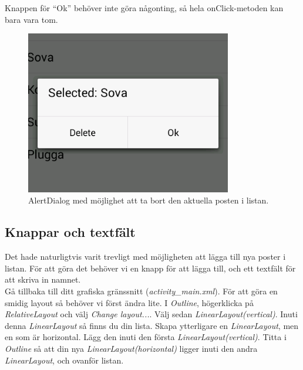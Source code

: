 \documentclass[11 pt, titlepage]{article} %
\begin{document}
Knappen för “Ok” behöver inte göra någonting, så hela onClick-metoden kan bara vara tom.\\

\begin{figure}[ht!]

\centering

\includegraphics[width=90mm]{images/popup.png}

\caption{AlertDialog med möjlighet att ta bort den aktuella posten i listan.}

\label{overflow}

\end{figure} 


\subsection{Knappar och textfält}
Det hade naturligtvis varit trevligt med möjligheten att lägga till nya poster i listan. För att göra det behöver vi en knapp för att lägga till, och ett textfält för att skriva in namnet.\\

Gå tillbaka till ditt grafiska gränssnitt (\textit{activity\_main.xml}). För att göra en smidig layout så behöver vi först ändra lite. I \textit{Outline}, högerklicka på \textit{RelativeLayout} och välj \textit{Change layout...}. Välj sedan \textit{LinearLayout(vertical)}. Inuti denna \textit{LinearLayout} så finns du din lista. Skapa ytterligare en \textit{LinearLayout}, men en som är horizontal. Lägg den inuti den första \textit{LinearLayout(vertical)}. Titta i \textit{Outline} så att din nya \textit{LinearLayout(horizontal)} ligger inuti den andra \textit{LinearLayout}, och ovanför listan.\\
\end{document}
